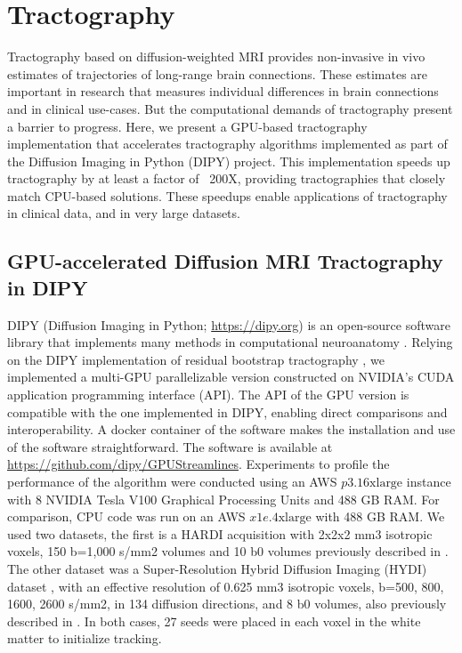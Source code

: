 \section{Tractography}
Tractography based on diffusion-weighted MRI provides non-invasive in vivo estimates of trajectories of long-range brain connections. These estimates are important in research that measures individual differences in brain connections and in clinical use-cases. But the computational demands of tractography present a barrier to progress. Here, we present a GPU-based tractography implementation that accelerates tractography algorithms implemented as part of the Diffusion Imaging in Python (DIPY) project. This implementation speeds up tractography by at least a factor of ~200X, providing tractographies that closely match CPU-based solutions. These speedups enable applications of tractography in clinical data, and in very large datasets.

\subsection{GPU-accelerated Diffusion MRI Tractography in DIPY}
DIPY (Diffusion Imaging in Python; \url{https://dipy.org}) is an open-source software library that implements many methods in computational neuroanatomy \cite{garyfallidis_dipy_2014}. Relying on the DIPY implementation of residual bootstrap tractography \cite{berman_probabilistic_2008}, we implemented a multi-GPU parallelizable version constructed on NVIDIA’s CUDA application programming interface (API).  The API of the GPU version is compatible with the one implemented in DIPY, enabling direct comparisons and interoperability. A docker container of the software makes the installation and use of the software straightforward. The software is available at \url{https://github.com/dipy/GPUStreamlines}. Experiments to profile the performance of the algorithm were conducted using an AWS $p3.16\textrm{xlarge}$ instance with 8 NVIDIA Tesla V100 Graphical Processing Units and 488 GB RAM. For comparison, CPU code was run on an AWS $x1e.4\textrm{xlarge}$ with 488 GB RAM. We used two datasets, the first is a HARDI acquisition with 2x2x2 mm3 isotropic voxels, 150 b=1,000 s/mm2 volumes and 10 b0 volumes previously described in \cite{rokem_evaluating_2015}. The other dataset was a Super-Resolution Hybrid Diffusion Imaging  (HYDI) dataset \cite{Garyfallidis2019}, with an effective resolution of 0.625 mm3 isotropic voxels, b=500, 800, 1600, 2600 s/mm2, in 134 diffusion directions, and 8 b0 volumes, also previously described in \cite{elsaid_super-resolution_2019}. In both cases, 27 seeds were placed in each voxel in the white matter to initialize tracking.

